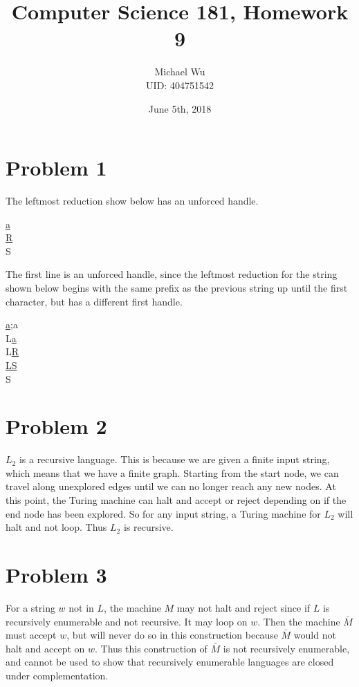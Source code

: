 \documentclass[12pt]{article}
\begin{document}
\title{Computer Science 181, Homework 9}
\date{June 5th, 2018}
\author{Michael Wu\\UID: 404751542}
\maketitle

\section*{Problem 1}

The leftmost reduction show below has an unforced handle.
\begin{center}
        \underline{a}\\
        \underline{R}\\
        S
\end{center}
The first line is an unforced handle, since the leftmost reduction for the string shown below begins with the same prefix as the previous string
up until the first character, but has a different first handle.
\begin{center}
        \underline{a;}a\\
        L\underline{a}\\
        L\underline{R}\\
        \underline{LS}\\
        S
\end{center}

\section*{Problem 2}

\(L_2\) is a recursive language. This is because we are given a finite input string, which means that we have a finite graph. Starting from the start
node, we can travel along unexplored edges until we can no longer reach any new nodes. At this point, the Turing machine can halt and accept or reject
depending on if the end node has been explored. So for any input string, a Turing machine for \(L_2\) will halt and not loop. Thus \(L_2\) is recursive.

\section*{Problem 3}

For a string \(w\) not in \(L\), the machine \(M\) may not halt and reject since if \(L\) is recursively enumerable and not recursive. It may
loop on \(w\). Then the machine \(\bar{M}\) must accept \(w\), but will never do so in this construction because \(\bar{M}\) would not halt
and accept on \(w\). Thus this construction of \(\bar{M}\) is not recursively enumerable, and cannot be used to show that recursively
enumerable languages are closed under complementation.
\end{document}
